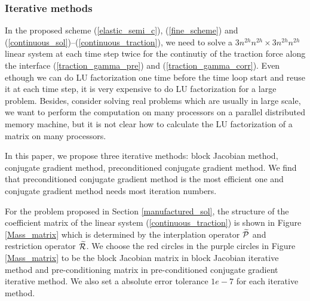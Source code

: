 \subsubsection{Iterative methods}\label{iterative_section}
In the proposed scheme (\ref{elastic_semi_c}), (\ref{fine_scheme}) and (\ref{continuous_sol})--(\ref{continuous_traction}), we need to solve a $3n^{2h}n^{2h}\times 3n^{2h}n^{2h}$ linear system at each time step twice for the continutiy of the traction force along the interface (\ref{traction_gamma_pre}) and (\ref{traction_gamma_corr}). Even ethough we can do LU factorization one time before the time loop start and reuse it at each time step, it is very expensive to do LU factorization for a large problem. Besides, consider solving real problems which are usually in large scale, we want to perform the computation on many processors on a parallel distributed memory machine, but it is not clear how to calculate the LU factorization of a matrix on many processors. 

In this paper, we propose three iterative methods: block Jacobian method, conjugate gradient method, preconditioned conjugate gradient method. We find that preconditioned conjugate gradient method is the most efficient one and conjugate gradient method needs most iteration numbers.

For the problem proposed in Section \ref{manufactured_sol}, the structure of the coefficient matrix of the linear system (\ref{continuous_traction}) is shown in Figure \ref{Mass_matrix} which is determined by the interplation operator $\widetilde{\mathcal{P}}$ and restriction operator $\widetilde{\mathcal{R}}$. We choose the red circles in the purple circles in Figure \ref{Mass_matrix} to be the block Jacobian matrix in block Jacobian iterative method and pre-conditioning matrix in pre-conditioned conjugate gradient iterative method. We also set a absolute error tolerance $1e-7$ for each iterative method.

